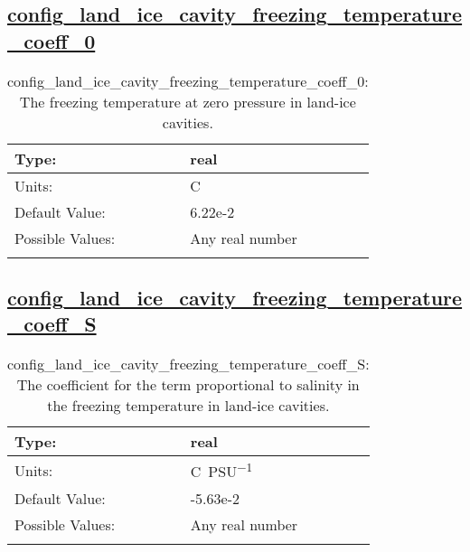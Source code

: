 \subsection[config\_land\_ice\_cavity\_freezing\_temperature\_coeff\_0]{\hyperref[sec:nm_tab_eos]{config\_land\_ice\_cavity\_freezing\_temperature\_coeff\_0}}
\label{subsec:nm_sec_config_land_ice_cavity_freezing_temperature_coeff_0}
\begin{center}
\begin{longtable}{| p{2.0in} || p{4.0in} |}
    \hline
    Type: & real \\
    \hline
    Units: & \si{C} \\
    \hline
    Default Value: & 6.22e-2 \\
    \hline
    Possible Values: & Any real number \\
    \hline
    \caption{config\_land\_ice\_cavity\_freezing\_temperature\_coeff\_0: The freezing temperature at zero pressure in land-ice cavities.}
\end{longtable}
\end{center}
\subsection[config\_land\_ice\_cavity\_freezing\_temperature\_coeff\_S]{\hyperref[sec:nm_tab_eos]{config\_land\_ice\_cavity\_freezing\_temperature\_coeff\_S}}
\label{subsec:nm_sec_config_land_ice_cavity_freezing_temperature_coeff_S}
\begin{center}
\begin{longtable}{| p{2.0in} || p{4.0in} |}
    \hline
    Type: & real \\
    \hline
    Units: & \si{C.PSU^{-1}} \\
    \hline
    Default Value: & -5.63e-2 \\
    \hline
    Possible Values: & Any real number \\
    \hline
    \caption{config\_land\_ice\_cavity\_freezing\_temperature\_coeff\_S: The coefficient for the term proportional to salinity in the freezing temperature in land-ice cavities.}
\end{longtable}
\end{center}
